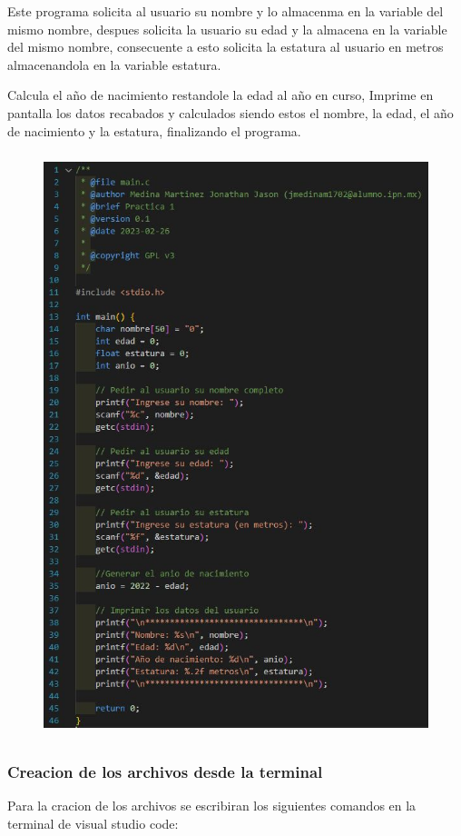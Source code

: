 \documentclass{article}
\begin{document}
Este programa solicita al usuario su nombre y lo almacenma en la variable del mismo nombre, despues solicita  la usuario su edad y la almacena en la variable del mismo nombre, consecuente a esto solicita la estatura al usuario en metros almacenandola en la variable estatura.

Calcula el año de nacimiento restandole la edad al año en curso, Imprime en pantalla los datos recabados y calculados siendo estos el nombre, la edad, el año de nacimiento y la estatura, finalizando el programa.

\begin{figure}[H]
    \centering
    \includegraphics[height = 17cm]{Codigo.jpg}
\end{figure}
\subsubsection{Creacion de los archivos desde la terminal}

Para la cracion de los archivos se escribiran los siguientes comandos en la terminal de visual studio code:
\end{document}
